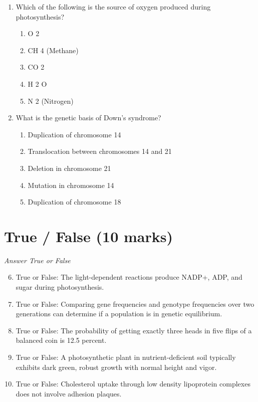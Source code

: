\documentclass[12pt]{article}
\begin{document}
\begin{enumerate}[label=\arabic*.]
\begin{enumerate}[label=(\alph*)]
    \item Oxygen is solely responsible for stimulating brain activity.
    \item Oxygen is used to synthesize proteins in cells.
\end{enumerate}
\item Which of the following is the source of oxygen produced during photosynthesis?
\begin{enumerate}[label=(\alph*)]
    \item O 2
    \item CH 4 (Methane)
    \item CO 2
    \item H 2 O
    \item N 2 (Nitrogen)
\end{enumerate}
\item What is the genetic basis of Down's syndrome?
\begin{enumerate}[label=(\alph*)]
    \item Duplication of chromosome 14
    \item Translocation between chromosomes 14 and 21
    \item Deletion in chromosome 21
    \item Mutation in chromosome 14
    \item Duplication of chromosome 18
\end{enumerate}
\end{enumerate}

\section*{True / False (10 marks)}
\textit{Answer True or False}
\begin{enumerate}[label=\arabic*.]
\setcounter{enumi}{5}
\item True or False: The light-dependent reactions produce NADP+, ADP, and sugar during photosynthesis.
\item True or False: Comparing gene frequencies and genotype frequencies over two generations can determine if a population is in genetic equilibrium.
\item True or False: The probability of getting exactly three heads in five flips of a balanced coin is 12.5 percent.
\item True or False: A photosynthetic plant in nutrient-deficient soil typically exhibits dark green, robust growth with normal height and vigor.
\item True or False: Cholesterol uptake through low density lipoprotein complexes does not involve adhesion plaques.
\end{enumerate}
\end{document}
